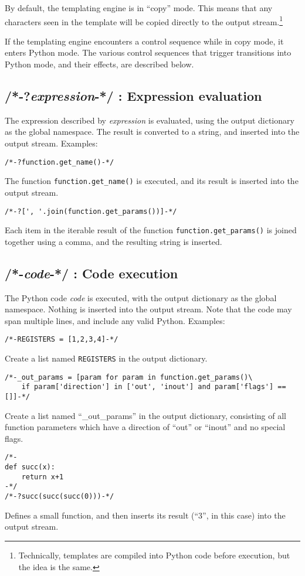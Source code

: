 By default, the templating engine is in ``copy'' mode. This means that any characters seen in the template will be copied directly to the output stream.\footnote{Technically, templates are compiled into Python code before execution, but the idea is the same.}

If the templating engine encounters a control sequence while in copy mode, it enters Python mode. The various control sequences that trigger transitions into Python mode, and their effects, are described below.

\subsection{/*-?\textit{expression}-*/ : Expression evaluation}
The expression described by \textit{expression} is evaluated, using the output dictionary as the global namespace. The result is converted to a string, and inserted into the output stream. Examples:

\begin{verbatim}
/*-?function.get_name()-*/
\end{verbatim}
The function {\tt function.get\_name()} is executed, and its result is inserted into the output stream.
\begin{verbatim}
/*-?[', '.join(function.get_params())]-*/
\end{verbatim}
Each item in the iterable result of the function \texttt{function.get\_params()} is joined together using a comma, and the resulting string is inserted.

\subsection{/*-\textit{code}-*/ : Code execution}
The Python code \textit{code} is executed, with the output dictionary as the global namespace. Nothing is inserted into the output stream. Note that the code may span multiple lines, and include any valid Python. Examples: 

\begin{verbatim}
/*-REGISTERS = [1,2,3,4]-*/
\end{verbatim}
Create a list named \texttt{REGISTERS} in the output dictionary.
\begin{verbatim}
/*-_out_params = [param for param in function.get_params()\
    if param['direction'] in ['out', 'inout'] and param['flags'] == []]-*/
\end{verbatim}
Create a list named ``\_out\_params'' in the output dictionary, consisting of all function parameters which have a direction of ``out'' or ``inout'' and no special flags. 
\begin{verbatim}
/*-
def succ(x):
    return x+1
-*/
/*-?succ(succ(succ(0)))-*/
\end{verbatim}
Defines a small function, and then inserts its result (``3'', in this case) into the output stream.

